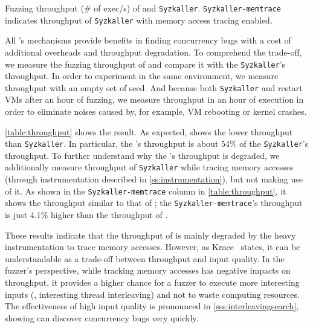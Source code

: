 %
\begin{table}[t]
  \small
  \centering
  
  \caption{Fuzzing throughput (\# of exec/s) of \sys and
    \texttt{Syzkaller}. \texttt{Syzkaller-memtrace} indicates
    throughput of \texttt{Syzkaller} with memory access tracing
    enabled.}
  \label{table:throughput}
\end{table}
%
All \sys's mechanisms provide benefits in finding concurrency bugs
with a cost of additional overheads and throughput degradation.
%
To comprehend the trade-off, we measure the fuzzing throughput of \sys
and compare it with the \texttt{Syzkaller}'s throughput.
%
In order to experiment in the same environment, we measure throughput
with an empty set of seed. And because both \texttt{Syzkaller} and
\sys restart VMs after an hour of fuzzing, we measure throughput in an
hour of execution in order to eliminate noises caused by, for example,
VM rebooting or kernel crashes.



\autoref{table:throughput} shows the result. As expected, \sys shows
the lower throughput than \texttt{Syzkaller}. In particular, the
\sys's throughput is about 54\% of the \texttt{Syzkaller}'s
throughput.
%
To further understand why the \sys's throughput is degraded, we
additionally measure throughput of \texttt{Syzkaller} while tracing
memory accesses (through instrumentation described in
\autoref{ss:instrumentation}), but not making use of it.
%
As shown in the \texttt{Syzkaller-memtrace} column in
\autoref{table:throughput}, it shows the throughput similar to that of
\sys; the \texttt{Syzkaller-memtrace}'s throughput is just 4.1\%
higher than the throughput of \sys.


These results indicate that the throughput of \sys is mainly degraded
by the heavy instrumentation to trace memory accesses.
%
However, as Krace~\cite{krace} states, it can be understandable as a
trade-off between throughput and input quality.
%
In the fuzzer's perspective, while tracking memory accesses has
negative impacts on throughput, it provides a higher chance for a
fuzzer to execute more interesting inputs (\ie, interesting thread
interleaving) and not to waste computing resources.
%
The effectiveness of high input quality is pronounced in
\autoref{sss:interleavingsearch}, showing \sys can discover
concurrency bugs very quickly.




